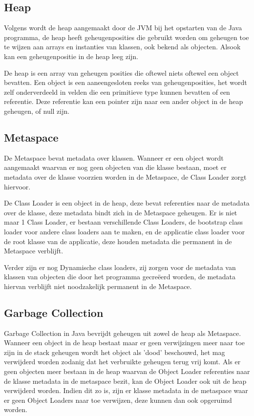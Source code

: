 \subsection{Heap}
\label{sec:heap}
Volgens \textcite{Grgic2018} wordt de heap aangemaakt door de JVM bij het opstarten van de Java programma, de heap heeft geheugenposities die gebruikt worden om geheugen toe te wijzen aan arrays en instanties van klassen, ook bekend als objecten.
Alsook kan een geheugenpositie in de heap leeg zijn.

De heap is een array van geheugen posities die oftewel niets oftewel een object bevatten.
Een object is een aaneengesloten reeks van geheugenposities, het wordt zelf onderverdeeld in velden die een primitieve type kunnen bevatten of een referentie.
Deze referentie kan een pointer zijn naar een ander object in de heap geheugen, of null zijn.\autocite{Bruno2018}
\subsection{Metaspace}
\label{sec:Metaspace}
De Metaspace bevat metadata over klassen.
Wanneer er een object wordt aangemaakt waarvan er nog geen objecten van die klasse bestaan, moet er metadata over de klasse voorzien worden in de Metaspace, de Class Loader zorgt hiervoor.

De Class Loader is een object in de heap, deze bevat referenties naar de metadata over de klasse, deze metadata bindt zich in de Metaspace geheugen.
Er is niet maar 1 Class Loader, er bestaan verschillende Class Loaders, de bootstrap class loader voor andere class loaders aan te maken, en de applicatie class loader voor de root klasse van de applicatie, deze houden metadata die permanent in de Metaspace verblijft.

Verder zijn er nog Dynamische class loaders, zij zorgen voor de metadata van klassen van objecten die door het programma gecreëerd worden, de metadata hiervan verblijft niet noodzakelijk permanent in de Metaspace.
\autocite{Putten2022}
\subsection{Garbage Collection}
\label{sec:garbage collection}
Garbage Collection in Java bevrijdt geheugen uit zowel de heap als Metaspace.
Wanneer een object in de heap bestaat maar er geen verwijzingen meer naar toe zijn in de stack geheugen wordt het object als 'dood' beschouwd, het mag verwijderd worden zodanig dat het verbruikte geheugen terug vrij komt.
Als er geen objecten meer bestaan in de heap waarvan de Object Loader referenties naar de klasse metadata in de metaspace bezit, kan de Object Loader ook uit de heap verwijderd worden.
Indien dit zo is, zijn er klasse metadata in de metaspace waar er geen Object Loaders naar toe verwijzen, deze kunnen dan ook opgeruimd worden. \autocite{Putten2022}

